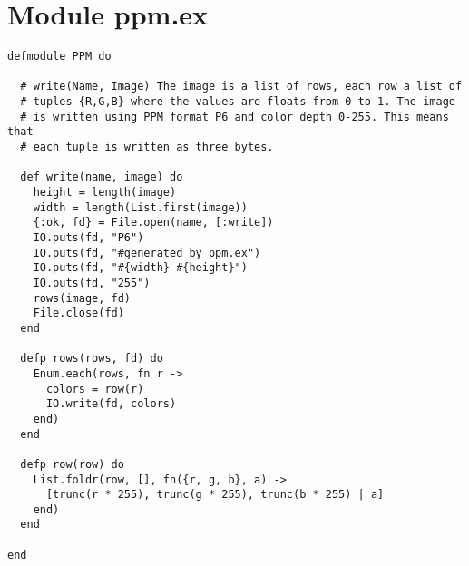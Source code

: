 \documentclass[a4paper,11pt]{article}
\begin{document}
\newpage
\appendix
\section{Module ppm.ex} \label{app:ppm}
\begin{verbatim}
defmodule PPM do

  # write(Name, Image) The image is a list of rows, each row a list of
  # tuples {R,G,B} where the values are floats from 0 to 1. The image
  # is written using PPM format P6 and color depth 0-255. This means that
  # each tuple is written as three bytes.

  def write(name, image) do
    height = length(image)
    width = length(List.first(image))
    {:ok, fd} = File.open(name, [:write])
    IO.puts(fd, "P6")
    IO.puts(fd, "#generated by ppm.ex")
    IO.puts(fd, "#{width} #{height}")
    IO.puts(fd, "255")
    rows(image, fd)
    File.close(fd)
  end

  defp rows(rows, fd) do
    Enum.each(rows, fn r ->
      colors = row(r)
      IO.write(fd, colors)
    end)
  end

  defp row(row) do
    List.foldr(row, [], fn({r, g, b}, a) ->
      [trunc(r * 255), trunc(g * 255), trunc(b * 255) | a]
    end)
  end

end

\end{verbatim}
\end{document}
